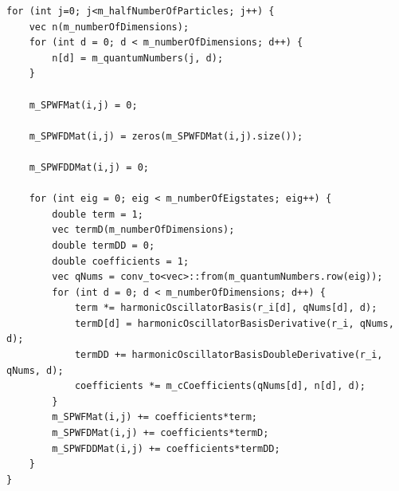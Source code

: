 \documentclass[../main.tex]{subfiles}
\begin{document}
\lstset{language=c++}
\begin{lstlisting}[caption={Loop updating the Slater matrices when the single particle wave functions are expanded in a basis of harmonic oscillator functions. $i$ is the index of the particle that was moved in the current Metropolis step, while $r\_i$ is the position of that particle. We need an additional loop over eigenstates compared to if we use closed form expressions for the single particle wave functions. We need two quantum number variables, one for the basis functions, and one which corresponds to the single particle wave function we're trying to approximate.}]
for (int j=0; j<m_halfNumberOfParticles; j++) {
    vec n(m_numberOfDimensions);
    for (int d = 0; d < m_numberOfDimensions; d++) {
        n[d] = m_quantumNumbers(j, d);
    }

    m_SPWFMat(i,j) = 0;

    m_SPWFDMat(i,j) = zeros(m_SPWFDMat(i,j).size());

    m_SPWFDDMat(i,j) = 0;

    for (int eig = 0; eig < m_numberOfEigstates; eig++) {
        double term = 1;
        vec termD(m_numberOfDimensions);
        double termDD = 0;
        double coefficients = 1;
        vec qNums = conv_to<vec>::from(m_quantumNumbers.row(eig));
        for (int d = 0; d < m_numberOfDimensions; d++) {
            term *= harmonicOscillatorBasis(r_i[d], qNums[d], d);
            termD[d] = harmonicOscillatorBasisDerivative(r_i, qNums, d);
            termDD += harmonicOscillatorBasisDoubleDerivative(r_i, qNums, d);
            coefficients *= m_cCoefficients(qNums[d], n[d], d);
        }
        m_SPWFMat(i,j) += coefficients*term;
        m_SPWFDMat(i,j) += coefficients*termD;
        m_SPWFDDMat(i,j) += coefficients*termDD;
    }
}
\end{lstlisting}
\end{document}
